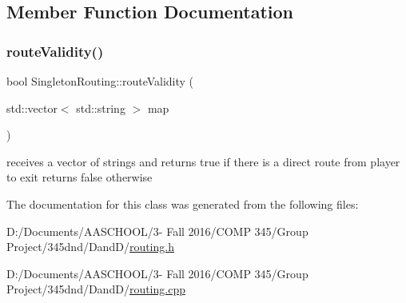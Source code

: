 \subsection{Member Function Documentation}
\hypertarget{class_singleton_routing_a2d5ddb26bf336e4877344353170bab61}{}\label{class_singleton_routing_a2d5ddb26bf336e4877344353170bab61} 
\subsubsection{\texorpdfstring{route\+Validity()}{routeValidity()}}
{\footnotesize\ttfamily bool Singleton\+Routing\+::route\+Validity (\begin{DoxyParamCaption}\item[{std\+::vector$<$ std\+::string $>$}]{map }\end{DoxyParamCaption})}

receives a vector of strings and returns true if there is a direct route from player to exit returns false otherwise 

The documentation for this class was generated from the following files\+:\begin{DoxyCompactItemize}
\item 
D\+:/\+Documents/\+A\+A\+S\+C\+H\+O\+O\+L/3-\/ Fall 2016/\+C\+O\+M\+P 345/\+Group Project/345dnd/\+Dand\+D/\hyperlink{routing_8h}{routing.\+h}\item 
D\+:/\+Documents/\+A\+A\+S\+C\+H\+O\+O\+L/3-\/ Fall 2016/\+C\+O\+M\+P 345/\+Group Project/345dnd/\+Dand\+D/\hyperlink{routing_8cpp}{routing.\+cpp}\end{DoxyCompactItemize}
